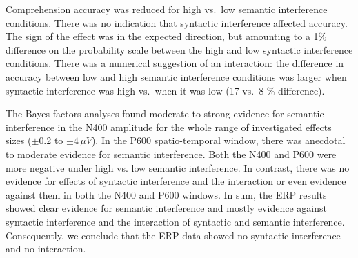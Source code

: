 \documentclass[review,preprint,12pt,authoryear,floatsintext]{elsarticle}
\begin{document}
Comprehension accuracy was reduced for high vs.\ low semantic interference conditions. There was no indication that syntactic interference affected accuracy. The sign of the effect was in the expected direction, but  amounting to a 1\% difference on the probability scale between the high and low syntactic interference conditions. There was a numerical suggestion of an interaction: the difference in accuracy between low and high semantic interference conditions was larger when syntactic interference was high vs.\ when it was low (17 vs.\ 8 \% difference). 

{The Bayes factors analyses found moderate to strong evidence for semantic interference in the N400 amplitude for the whole range of investigated effects sizes ($\pm$0.2 to $\pm4$\,$\mu V$). In the P600 spatio-temporal window, there was anecdotal to moderate evidence for semantic interference. Both the N400 and P600 were more negative under high vs. low semantic interference. In contrast, there was no evidence for effects of syntactic interference and the interaction or even evidence against them in both the N400 and P600 windows. In sum, the ERP results showed clear evidence for semantic interference and mostly evidence against syntactic interference and the interaction of syntactic and semantic interference. Consequently, we conclude that the ERP data showed no syntactic interference and no interaction.}\label{ERP_discussion}
\end{document}
